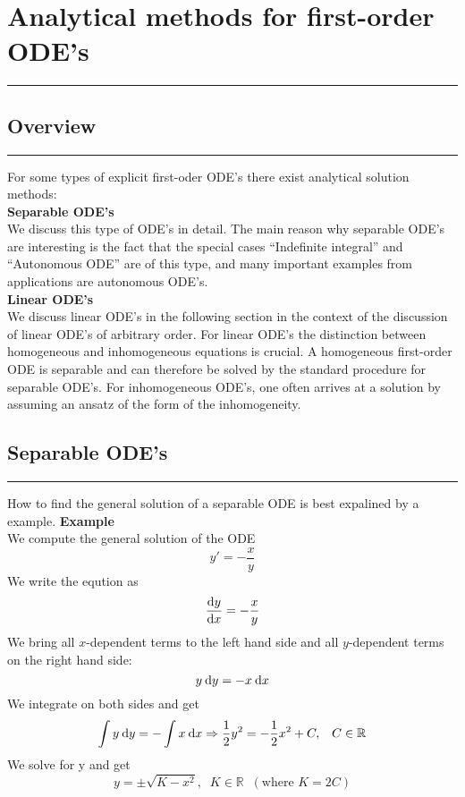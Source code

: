\section{Analytical methods for first-order ODE’s}
\noindent\rule[\linienAbstand]{\linewidth}{\linienDickeDick}

\subsection{Overview}
\noindent\rule[\linienAbstand]{\linewidth}{\linienDicke}
For some types of explicit first-oder ODE’s there exist analytical solution methods:\\

\textbf{Separable ODE's}\\
We discuss this type of ODE’s in detail. The main reason why separable ODE’s are interesting is the fact that the special cases “Indefinite integral” and “Autonomous ODE” are of this type, and many important examples from applications are autonomous ODE’s.\\

\textbf{Linear ODE's}\\
We discuss linear ODE’s in the following section in the context of the discussion of linear ODE’s of arbitrary order. For linear ODE’s the distinction between homogeneous and inhomogeneous equations is crucial. A homogeneous first-order ODE is separable and can therefore be solved by the standard procedure for separable ODE’s. For inhomogeneous ODE’s, one often arrives at a solution by assuming an ansatz of the form of the inhomogeneity.\\


\subsection{Separable ODE’s}
\noindent\rule[\linienAbstand]{\linewidth}{\linienDicke}
How to find the general solution of a separable ODE is best expalined by a example.
\textbf{Example}\\
We compute the general solution of the ODE
\begin{equation}
  y' = -\frac{x}{y}
\end{equation}
We write the eqution as
\begin{equation}
  \frac{\textup{d}y}{\textup{d}x} = -\frac{x}{y}
\end{equation}
We bring all $x$-dependent terms to the left hand side and all $y$-dependent terms on
the right hand side:
\begin{equation}
  y\:\textup{d}y = -x \:\textup{d}x
\end{equation}
We integrate on both sides and get
\begin{equation}
  \int y\:\textup{d}y = - \int x\:\textup{d}x \Rightarrow \frac{1}{2}y^2 = - \frac{1}{2} x^2 + C, \;\;\; C \in \mathbb{R}
\end{equation}
We solve for y and get
\begin{equation}
  y = \pm \sqrt{K - x^2}, \;\; K \in \mathbb{R}\;\; (\text{where } K = 2C)
\end{equation}

